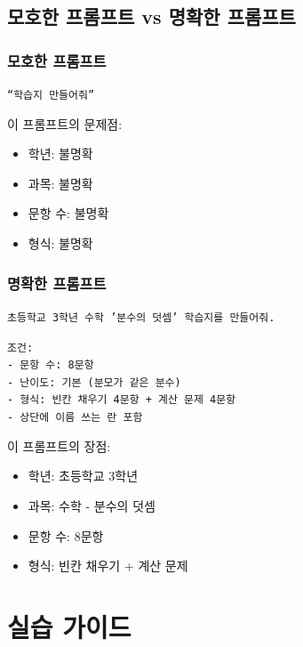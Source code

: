 \documentclass[11pt,a4paper]{article}
\begin{document}
\subsection{모호한 프롬프트 vs 명확한 프롬프트}

\subsubsection{모호한 프롬프트}

\begin{codebox}
\texttt{``학습지 만들어줘''}
\end{codebox}

이 프롬프트의 문제점:
\begin{itemize}
  \item 학년: 불명확
  \item 과목: 불명확
  \item 문항 수: 불명확
  \item 형식: 불명확
\end{itemize}

\subsubsection{명확한 프롬프트}

\begin{codebox}
\texttt{초등학교 3학년 수학 '분수의 덧셈' 학습지를 만들어줘.}

\texttt{조건:}\\
\texttt{- 문항 수: 8문항}\\
\texttt{- 난이도: 기본 (분모가 같은 분수)}\\
\texttt{- 형식: 빈칸 채우기 4문항 + 계산 문제 4문항}\\
\texttt{- 상단에 이름 쓰는 란 포함}
\end{codebox}

이 프롬프트의 장점:
\begin{itemize}
  \item 학년: 초등학교 3학년 \checkmark
  \item 과목: 수학 - 분수의 덧셈 \checkmark
  \item 문항 수: 8문항 \checkmark
  \item 형식: 빈칸 채우기 + 계산 문제 \checkmark
\end{itemize}

\newpage

\section{실습 가이드}
\end{document}
